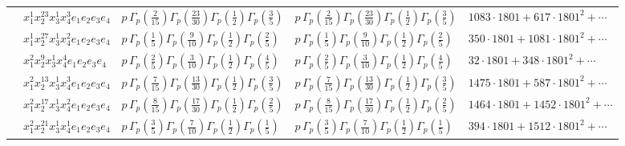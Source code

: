 \documentclass[11pt]{article}
\begin{document}
\begin{table}[ht]
{\begin{tabular}{@{}lllll@{}}
 & $x_{1}^{1} x_{2}^{23} x_{3}^{1} x_{4}^{3}  e_{1} e_{2} e_{3} e_{4}$ & $p \, \Gamma_p \left( \frac{2}{15} \right) \Gamma_p \left( \frac{23}{30} \right) \Gamma_p \left( \frac{1}{2} \right) \Gamma_p \left( \frac{3}{5} \right)$ & $p \, \Gamma_p \left( \frac{2}{15} \right) \Gamma_p \left( \frac{23}{30} \right) \Gamma_p \left( \frac{1}{2} \right) \Gamma_p \left( \frac{3}{5} \right)$ & $1083{\cdot}1801{+}617{\cdot}1801^{2}{+}\cdots$ \\
 & $x_{1}^{1} x_{2}^{27} x_{3}^{1} x_{4}^{2}  e_{1} e_{2} e_{3} e_{4}$ & $p \, \Gamma_p \left( \frac{1}{5} \right) \Gamma_p \left( \frac{9}{10} \right) \Gamma_p \left( \frac{1}{2} \right) \Gamma_p \left( \frac{2}{5} \right)$ & $p \, \Gamma_p \left( \frac{1}{5} \right) \Gamma_p \left( \frac{9}{10} \right) \Gamma_p \left( \frac{1}{2} \right) \Gamma_p \left( \frac{2}{5} \right)$ & $350{\cdot}1801{+}1081{\cdot}1801^{2}{+}\cdots$ \\
 & $x_{1}^{2} x_{2}^{9} x_{3}^{1} x_{4}^{4}  e_{1} e_{2} e_{3} e_{4}$ & $p \, \Gamma_p \left( \frac{2}{5} \right) \Gamma_p \left( \frac{3}{10} \right) \Gamma_p \left( \frac{1}{2} \right) \Gamma_p \left( \frac{4}{5} \right)$ & $p \, \Gamma_p \left( \frac{2}{5} \right) \Gamma_p \left( \frac{3}{10} \right) \Gamma_p \left( \frac{1}{2} \right) \Gamma_p \left( \frac{4}{5} \right)$ & $32{\cdot}1801{+}348{\cdot}1801^{2}{+}\cdots$ \\
 & $x_{1}^{2} x_{2}^{13} x_{3}^{1} x_{4}^{3}  e_{1} e_{2} e_{3} e_{4}$ & $p \, \Gamma_p \left( \frac{7}{15} \right) \Gamma_p \left( \frac{13}{30} \right) \Gamma_p \left( \frac{1}{2} \right) \Gamma_p \left( \frac{3}{5} \right)$ & $p \, \Gamma_p \left( \frac{7}{15} \right) \Gamma_p \left( \frac{13}{30} \right) \Gamma_p \left( \frac{1}{2} \right) \Gamma_p \left( \frac{3}{5} \right)$ & $1475{\cdot}1801{+}587{\cdot}1801^{2}{+}\cdots$ \\
 & $x_{1}^{2} x_{2}^{17} x_{3}^{1} x_{4}^{2}  e_{1} e_{2} e_{3} e_{4}$ & $p \, \Gamma_p \left( \frac{8}{15} \right) \Gamma_p \left( \frac{17}{30} \right) \Gamma_p \left( \frac{1}{2} \right) \Gamma_p \left( \frac{2}{5} \right)$ & $p \, \Gamma_p \left( \frac{8}{15} \right) \Gamma_p \left( \frac{17}{30} \right) \Gamma_p \left( \frac{1}{2} \right) \Gamma_p \left( \frac{2}{5} \right)$ & $1464{\cdot}1801{+}1452{\cdot}1801^{2}{+}\cdots$ \\
 & $x_{1}^{2} x_{2}^{21} x_{3}^{1} x_{4}^{1}  e_{1} e_{2} e_{3} e_{4}$ & $p \, \Gamma_p \left( \frac{3}{5} \right) \Gamma_p \left( \frac{7}{10} \right) \Gamma_p \left( \frac{1}{2} \right) \Gamma_p \left( \frac{1}{5} \right)$ & $p \, \Gamma_p \left( \frac{3}{5} \right) \Gamma_p \left( \frac{7}{10} \right) \Gamma_p \left( \frac{1}{2} \right) \Gamma_p \left( \frac{1}{5} \right)$ & $394{\cdot}1801{+}1512{\cdot}1801^{2}{+}\cdots$ \\

\end{tabular}}
\end{table}
\end{document}
